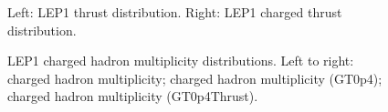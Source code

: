 \begin{figure}[H]
\centering
{}\hfill
{}\hfill %
\caption{Left: LEP1 thrust distribution. Right: LEP1 charged thrust distribution.}
\end{figure}

\begin{figure}[H]
\centering
{}\hfill
{}\hfill
{}\hfill
\caption{LEP1 charged hadron multiplicity distributions. Left to right: charged hadron multiplicity; charged hadron multiplicity (GT0p4); charged hadron multiplicity (GT0p4Thrust).}
\end{figure}

